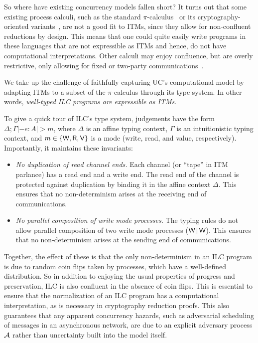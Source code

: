 So where have existing concurrency models fallen short?  It turns out that some
existing process calculi, such as the standard
$\pi$-calculus~\cite{milner1999communicating} or its cryptography-oriented
variants~\cite{abadi1999calculus, abadi2001mobile}, are not a good fit to ITMs,
since they allow for non-confluent reductions by design. This means that one
could quite easily write programs in these languages that are not expressible as
ITMs and hence, do not have computational interpretations. Other calculi may
enjoy confluence, but are overly restrictive, only allowing for fixed or
two-party
communications~\cite{kobayashi1999linearity,bohl2016symbolic,fowler2018session}. 

We take up the challenge of faithfully capturing UC's computational model by
adapting ITMs to a subset of the $\pi$-calculus through its type system. In other
words, \emph{well-typed ILC programs are expressible as ITMs}.

To give a quick tour of ILC's type system, judgements have the form $\Delta ; \Gamma |- e
: A |> m$, where $\Delta$ is an affine typing context, $\Gamma$ is an intuitionistic typing
context, and $m \in \{\textsf{W}, \textsf{R}, \textsf{V}\}$ is a mode (write, read, and value,
respectively). Importantly, it maintains these invariants:

\begin{itemize}[leftmargin=*]
\item \emph{No duplication of read channel ends.} Each channel (or ``tape'' in
  ITM parlance) has a read end and a write end. The read end of the channel is
  protected against duplication by binding it in the affine context $\Delta$. This
  ensures that no non-determinism arises at the receiving end of communications.

\item \emph{No parallel composition of write mode processes.} The typing rules
  do not allow parallel composition of two write mode processes ($\textsf{W} ||
  \textsf{W}$). This ensures that no non-determinism arises at the sending end of
  communications.
\end{itemize}

Together, the effect of these is that the only non-determinism in an ILC program
is due to random coin flips taken by processes, which have a well-defined
distribution. So in addition to enjoying the usual properties of progress and
preservation, ILC is also confluent in the absence of coin flips. This is
essential to ensure that the normalization of an ILC program has a computational
interpretation, as is necessary in cryptography reduction proofs. 
This also guarantees that any apparent concurrency hazards, such as adversarial
scheduling of messages in an asynchronous network, are due to an explicit
adversary process $\mathcal{{A}}$ rather than uncertainty built into the model itself.

